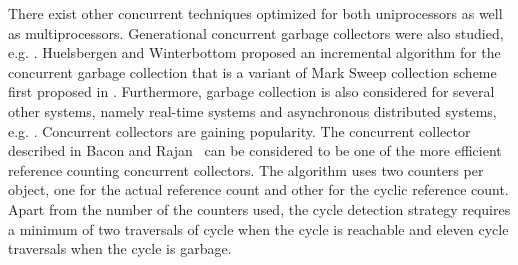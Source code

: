 There exist other concurrent techniques optimized for both uniprocessors as well as multiprocessors. Generational concurrent garbage collectors were also studied, e.g. \cite{Printezis:2000}. Huelsbergen and Winterbottom \cite{Huelsbergen1998} proposed an incremental algorithm for the concurrent garbage collection that is a variant of Mark Sweep collection scheme first proposed in \cite{McCarthy1960}.
Furthermore, garbage collection is also considered for several other systems, namely real-time systems %
and asynchronous distributed systems, e.g. \cite{Pizlo2008,Veiga2005}.
Concurrent collectors are gaining popularity. The concurrent collector described in Bacon and Rajan~\cite{Bacon2001} can be considered to be one of the more efficient reference counting concurrent collectors. The algorithm uses two counters per object, one for the actual reference count and other for the cyclic reference count. Apart from the number of the counters used, the cycle detection strategy requires a minimum of two traversals of cycle when the cycle is reachable and eleven cycle traversals when the cycle is garbage.

